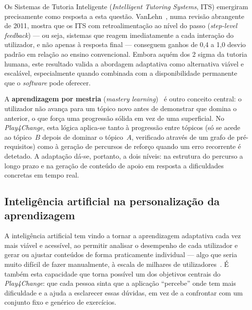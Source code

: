 Os Sistemas de Tutoria Inteligente (\emph{Intelligent Tutoring Systems}, ITS) emergiram precisamente como resposta a esta questão. VanLehn~\cite{vanlehn2011relative}, numa revisão abrangente de 2011, mostra que os ITS com retroalimentação ao nível do passo (\emph{step-level feedback}) --- ou seja, sistemas que reagem imediatamente a cada interação do utilizador, e não apenas à resposta final --- conseguem ganhos de 0,4 a 1,0 desvio padrão em relação ao ensino convencional. Embora aquém dos 2 sigma da tutoria humana, este resultado valida a abordagem adaptativa como alternativa viável e escalável, especialmente quando combinada com a disponibilidade permanente que o \emph{software} pode oferecer.

A \textbf{aprendizagem por mestria} (\emph{mastery learning})~\cite{bloom1968learning} é outro conceito central: o utilizador não avança para um tópico novo antes de demonstrar que domina o anterior, o que força uma progressão sólida em vez de uma superficial. No \emph{Play4Change}, esta lógica aplica-se tanto à progressão entre tópicos (só se acede ao tópico~$B$ depois de dominar o tópico~$A$, verificado através de um grafo de pré-requisitos) como à geração de percursos de reforço quando um erro recorrente é detetado. A adaptação dá-se, portanto, a dois níveis: na estrutura do percurso a longo prazo e na geração de conteúdo de apoio em resposta a dificuldades concretas em tempo real.

\subsection*{Inteligência artificial na personalização da aprendizagem}

A inteligência artificial tem vindo a tornar a aprendizagem adaptativa cada vez mais viável e acessível, ao permitir analisar o desempenho de cada utilizador e gerar ou ajustar conteúdos de forma praticamente individual --- algo que seria muito difícil de fazer manualmente, à escala de milhares de utilizadores~\cite{kasneci2023chatgpt}. É também esta capacidade que torna possível um dos objetivos centrais do \emph{Play4Change}: que cada pessoa sinta que a aplicação ``percebe'' onde tem mais dificuldade e a ajuda a esclarecer essas dúvidas, em vez de a confrontar com um conjunto fixo e genérico de exercícios.

